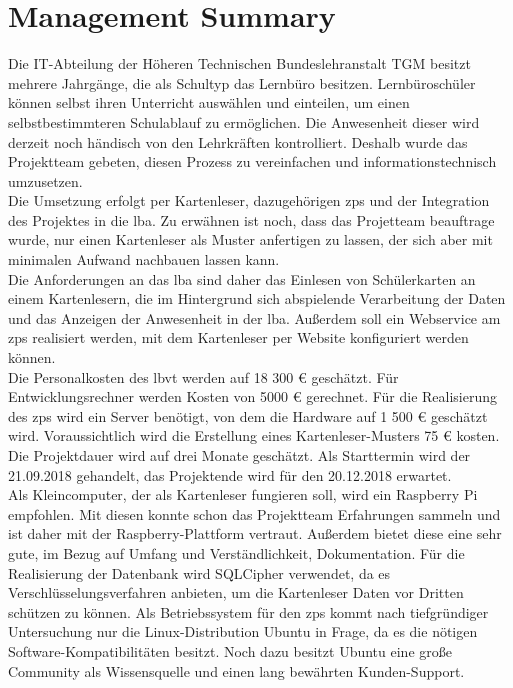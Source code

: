 \newpage
\section{Management Summary}
Die IT-Abteilung der Höheren Technischen Bundeslehranstalt TGM besitzt mehrere Jahrgänge, die als Schultyp das Lernbüro besitzen. Lernbüroschüler können selbst ihren Unterricht auswählen und einteilen, um einen selbstbestimmteren Schulablauf zu ermöglichen. Die Anwesenheit dieser wird derzeit noch händisch von den Lehrkräften kontrolliert. Deshalb wurde das Projektteam gebeten, diesen Prozess zu vereinfachen und informationstechnisch umzusetzen. 
\vspace{0.2cm} \\
Die Umsetzung erfolgt per Kartenleser, dazugehörigen \gls{zps} und der Integration des Projektes in die \gls{lba}. Zu erwähnen ist noch, dass das Projetteam beauftrage wurde, nur einen Kartenleser als Muster anfertigen zu lassen, der sich aber mit minimalen Aufwand nachbauen lassen kann.
\vspace{0.2cm} \\
Die Anforderungen an das \gls{lba} sind daher das Einlesen von Schülerkarten an einem Kartenlesern, die im Hintergrund sich abspielende Verarbeitung der Daten und das Anzeigen der Anwesenheit in der \gls{lba}. Außerdem soll ein Webservice am \gls{zps} realisiert werden, mit dem Kartenleser per Website konfiguriert werden können. 
\vspace{0.2cm} \\
Die Personalkosten des \gls{lbvt} werden auf 18 300 € geschätzt. Für Entwicklungsrechner werden Kosten  von 5000 € gerechnet. Für die Realisierung des \gls{zps} wird ein Server benötigt, von dem die Hardware auf 1 500 € geschätzt wird. Voraussichtlich wird die Erstellung eines Kartenleser-Musters 75 € kosten. 
\vspace{0.2cm} \\
Die Projektdauer wird auf drei Monate geschätzt. Als Starttermin wird der 21.09.2018 gehandelt, das Projektende wird für den 20.12.2018 erwartet.
\vspace{0.2cm} \\
Als Kleincomputer, der als Kartenleser fungieren soll, wird ein Raspberry Pi empfohlen. Mit diesen konnte schon das Projektteam Erfahrungen sammeln und ist daher mit der Raspberry-Plattform vertraut. Außerdem bietet diese eine sehr gute, im Bezug auf Umfang und Verständlichkeit, Dokumentation. Für die Realisierung der Datenbank wird SQLCipher verwendet, da es Verschlüsselungsverfahren anbieten, um die Kartenleser Daten vor Dritten schützen zu können. Als Betriebssystem für den \gls{zps} kommt nach tiefgründiger Untersuchung nur die Linux-Distribution Ubuntu in Frage, da es die nötigen Software-Kompatibilitäten besitzt. Noch dazu besitzt Ubuntu eine große Community als Wissensquelle und einen lang bewährten Kunden-Support. 
